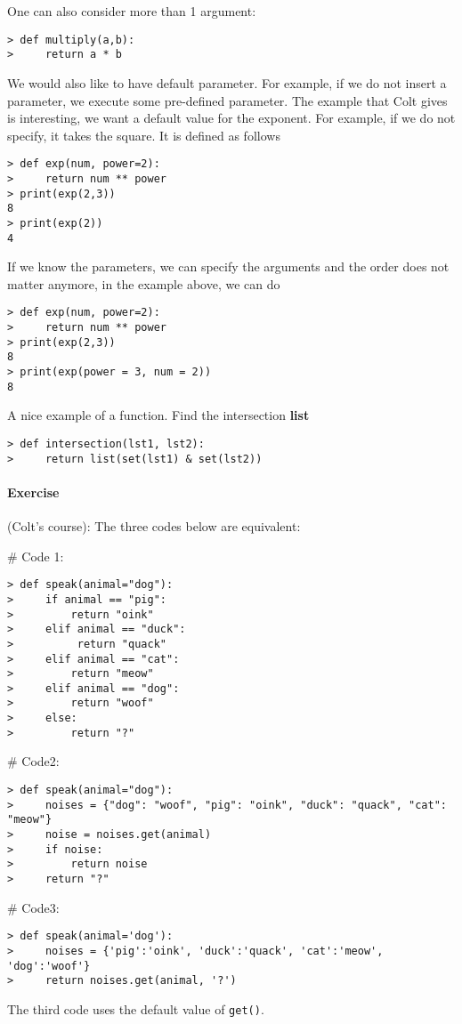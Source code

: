 One can also consider more than 1 argument:
\begin{verbatim}
> def multiply(a,b):
>     return a * b
\end{verbatim}

We would also like to have default parameter. For example, if we do not insert a parameter, we execute some pre-defined parameter. The example that Colt gives is interesting, we want a default value for the exponent. For example, if we do not specify, it takes the square. It is defined as follows
\begin{verbatim}
> def exp(num, power=2):
>     return num ** power
> print(exp(2,3))
8
> print(exp(2))
4
\end{verbatim}
If we know the parameters, we can specify the arguments and the order does not matter anymore, in the example above, we can do
\begin{verbatim}
> def exp(num, power=2):
>     return num ** power
> print(exp(2,3))
8
> print(exp(power = 3, num = 2))
8
\end{verbatim}

A nice example of a function. Find the intersection {\bf list}
\begin{verbatim}
> def intersection(lst1, lst2):
>     return list(set(lst1) & set(lst2))
\end{verbatim}


\paragraph{Exercise} (Colt's course): The three codes below are equivalent:

\# Code 1: 
\begin{verbatim}
> def speak(animal="dog"):
>     if animal == "pig":
>         return "oink"
>     elif animal == "duck":
>          return "quack"
>     elif animal == "cat":
>         return "meow"
>     elif animal == "dog":
>         return "woof"
>     else:
>         return "?"
\end{verbatim}

\# Code2: 
\begin{verbatim}
> def speak(animal="dog"):
>     noises = {"dog": "woof", "pig": "oink", "duck": "quack", "cat": "meow"}
>     noise = noises.get(animal)
>     if noise:
>         return noise
>     return "?"
\end{verbatim}

\# Code3:
\begin{verbatim}
> def speak(animal='dog'):
>     noises = {'pig':'oink', 'duck':'quack', 'cat':'meow', 'dog':'woof'}
>     return noises.get(animal, '?')
\end{verbatim}
The third code uses the default value of \verb|get()|.

